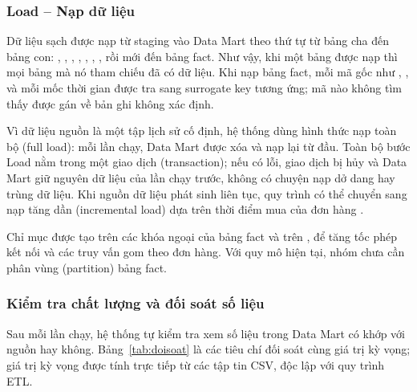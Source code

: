 \subsubsection{Load -- Nạp dữ liệu}

Dữ liệu sạch được nạp từ staging vào Data Mart theo thứ tự từ bảng cha đến bảng con: , , , , , , , rồi mới đến bảng fact. Như vậy, khi một bảng được nạp thì mọi bảng mà nó tham chiếu đã có dữ liệu. Khi nạp bảng fact, mỗi mã gốc như , ,  và mỗi mốc thời gian được tra sang surrogate key tương ứng; mã nào không tìm thấy được gán về bản ghi không xác định.

Vì dữ liệu nguồn là một tập lịch sử cố định, hệ thống dùng hình thức nạp toàn bộ (full load): mỗi lần chạy, Data Mart được xóa và nạp lại từ đầu. Toàn bộ bước Load nằm trong một giao dịch (transaction); nếu có lỗi, giao dịch bị hủy và Data Mart giữ nguyên dữ liệu của lần chạy trước, không có chuyện nạp dở dang hay trùng dữ liệu. Khi nguồn dữ liệu phát sinh liên tục, quy trình có thể chuyển sang nạp tăng dần (incremental load) dựa trên thời điểm mua của đơn hàng \cite{kimball}.

Chỉ mục được tạo trên các khóa ngoại của bảng fact và trên , để tăng tốc phép kết nối và các truy vấn gom theo đơn hàng. Với quy mô hiện tại, nhóm chưa cần phân vùng (partition) bảng fact.

\subsubsection{Kiểm tra chất lượng và đối soát số liệu}

Sau mỗi lần chạy, hệ thống tự kiểm tra xem số liệu trong Data Mart có khớp với nguồn hay không. Bảng~\ref{tab:doisoat} là các tiêu chí đối soát cùng giá trị kỳ vọng; giá trị kỳ vọng được tính trực tiếp từ các tập tin CSV, độc lập với quy trình ETL.


